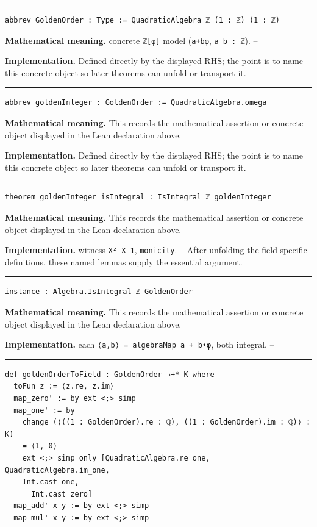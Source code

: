 \documentclass[UTF8,a4paper,11pt,fontset=fandol]{ctexart}
\theoremstyle{definition}
\newcommand{\statementsep}{\par\medskip\hrule\medskip}
\begin{document}
\statementsep
\begin{verbatim}
abbrev GoldenOrder : Type := QuadraticAlgebra ℤ (1 : ℤ) (1 : ℤ)
\end{verbatim}
\noindent\textbf{Mathematical meaning.} concrete \texttt{ℤ[φ]} model (\texttt{a+bφ}, \texttt{a b : ℤ}). --\par
\noindent\textbf{Implementation.} Defined directly by the displayed RHS; the point is to name this concrete object so later theorems can unfold or transport it.\par
\statementsep
\begin{verbatim}
abbrev goldenInteger : GoldenOrder := QuadraticAlgebra.omega
\end{verbatim}
\noindent\textbf{Mathematical meaning.} This records the mathematical assertion or concrete object displayed in the Lean declaration above.\par
\noindent\textbf{Implementation.} Defined directly by the displayed RHS; the point is to name this concrete object so later theorems can unfold or transport it.\par
\statementsep
\begin{verbatim}
theorem goldenInteger_isIntegral : IsIntegral ℤ goldenInteger
\end{verbatim}
\noindent\textbf{Mathematical meaning.} This records the mathematical assertion or concrete object displayed in the Lean declaration above.\par
\noindent\textbf{Implementation.} witness \texttt{X²-X-1}, \texttt{monicity}. -- After unfolding the field-specific definitions, these named lemmas supply the essential argument.\par
\statementsep
\begin{verbatim}
instance : Algebra.IsIntegral ℤ GoldenOrder
\end{verbatim}
\noindent\textbf{Mathematical meaning.} This records the mathematical assertion or concrete object displayed in the Lean declaration above.\par
\noindent\textbf{Implementation.} each \texttt{⟨a,b⟩ = algebraMap a + b•φ}, both integral. --\par
\statementsep
\begin{verbatim}
def goldenOrderToField : GoldenOrder →+* K where
  toFun z := ⟨z.re, z.im⟩
  map_zero' := by ext <;> simp
  map_one' := by
    change (⟨((1 : GoldenOrder).re : ℚ), ((1 : GoldenOrder).im : ℚ)⟩ : K)
    = ⟨1, 0⟩
    ext <;> simp only [QuadraticAlgebra.re_one, QuadraticAlgebra.im_one,
    Int.cast_one,
      Int.cast_zero]
  map_add' x y := by ext <;> simp
  map_mul' x y := by ext <;> simp
\end{verbatim}
\end{document}
